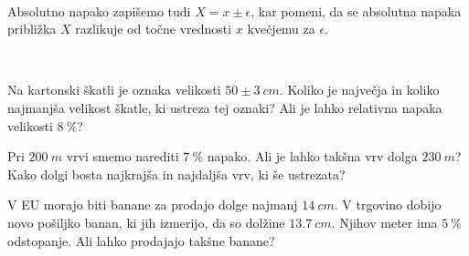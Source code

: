             ~~
        
            Absolutno napako zapišemo tudi $X=x\pm\epsilon$, kar pomeni, da se absolutna napaka približka $X$ razlikuje od točne vrednosti $x$ kvečjemu za $\epsilon$.
        
    
~~\\


    
        \begin{naloga}
            Na kartonski škatli je oznaka velikosti $50 \pm 3 ~cm$.
            Koliko je največja in koliko najmanjša velikost škatle, ki ustreza tej oznaki? 
            Ali je lahko relativna napaka velikosti $8~\%$?            
        \end{naloga}
        
        \begin{naloga}
            Pri $200~m$ vrvi smemo narediti $7~\%$ napako.
            Ali je lahko takšna vrv dolga $230~m$?
            Kako dolgi bosta najkrajša in najdaljša vrv, ki še ustrezata?            
        \end{naloga}
        
        \begin{naloga}
            V EU morajo biti banane za prodajo dolge najmanj $14~cm$. 
            V trgovino dobijo novo pošiljko banan, ki jih izmerijo, da so dolžine $13.7~cm$. 
            Njihov meter ima $5~\%$ odstopanje. 
            Ali lahko prodajajo takšne banane?            
        \end{naloga}

    